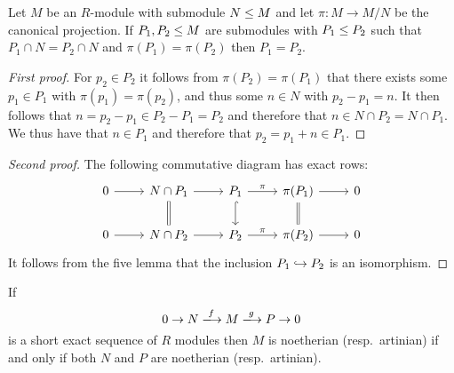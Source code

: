 \begin{lemma}
  \label{lemma: noether artinian ses preparation}
  Let $M$ be an $R$-module with submodule $N \leq M$ and let $\pi \colon M \to M/N$ be the canonical projection.
  If $P_1, P_2 \leq M$ are submodules with $P_1 \leq P_2$ such that $P_1 \cap N = P_2 \cap N$ and $\pi(P_1) = \pi(P_2)$ then $P_1 = P_2$.
\end{lemma}


\begin{proof}[First proof]
  For $p_2 \in P_2$ it follows from $\pi(P_2) = \pi(P_1)$ that there exists some $p_1 \in P_1$ with $\pi(p_1) = \pi(p_2)$, and thus some $n \in N$ with $p_2 - p_1 = n$.
  It then follows that $n = p_2 - p_1 \in P_2 - P_1 = P_2$ and therefore that $n \in N \cap P_2 = N \cap P_1$.
  We thus have that $n \in P_1$ and therefore that $p_2 = p_1 + n \in P_1$.
\end{proof}


\begin{proof}[Second proof]
  The following commutative diagram has exact rows:
  \[
    \begin{tikzcd}
        0
        \arrow{r}
      & N \cap P_1
        \arrow{r}
        \arrow[equal]{d}
      & P_1
        \arrow{r}{\pi}
        \arrow[hook]{d}
      & \pi(P_1)
        \arrow{r}
        \arrow[equal]{d}
      & 0
      \\
        0
        \arrow{r}
      & N \cap P_2
        \arrow{r}
      & P_2
        \arrow{r}{\pi}
      & \pi(P_2)
        \arrow{r}
      & 0
    \end{tikzcd}
  \]
  It follows from the five lemma that the inclusion $P_1 \hookrightarrow P_2$ is an isomorphism.
\end{proof}


\begin{proposition}
  \label{proposition: noether artin ses}
  If
  \begin{equation}
    \label{equation: original ses for notherian}
                        0
    \to                 N
    \xlongrightarrow{f} M
    \xlongrightarrow{g} P
    \to                 0
  \end{equation}
  is a short exact sequence of $R$ modules then $M$ is noetherian (resp.\ artinian) if and only if both $N$ and $P$ are noetherian (resp.\ artinian).
\end{proposition}


